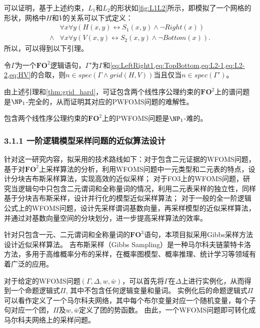 \documentclass[12pt,UTF8,AutoFakeBold=3,a4paper]{ctexart} %
\newcommand{\sentence}{\Gamma}
\newcommand{\weight}{w}
\newcommand{\negweight}{\bar{w}}
\newcommand{\wfoms}{WFOMS}
\newcommand{\fotwo}{\ensuremath{\mathbf{FO}^2}}
\newcommand{\fothree}{\ensuremath{\mathbf{FO}^3}}
\newcommand{\domain}{\Delta}
\begin{document}
可以证明，基于上述约束，$L_1$和$L_2$的形状如\cref{fig:L1L2}所示，即模拟了一个网格的形状，网格中$H$和$V$的关系可以下式定义：
\begin{equation}
  \begin{aligned}
    & \forall x \forall y (H(x,y) \leftrightarrow S_1(x,y) \land \lnot Right(x)) \\
    \land & \forall x \forall y (V(x,y) \leftrightarrow S_2(x,y) \land \lnot Bottom(x)).
  \end{aligned}
  \label{eq:HV}
\end{equation}
所以，可以得到以下引理。

\begin{lemma}\label{lemma:grid_2lo}
  令$\sentence$为一个\fotwo{}逻辑语句，$\sentence'$为$\sentence$和\cref{eq:LeftRight1,eq:TopBottom,eq:L2-1,eq:L2-2,eq:HV}的合取，则$n\in spec(\sentence\land grid(H,V))$当且仅当$n\in spec(\sentence')$。
\end{lemma}

由上述引理和\cref{thm:grid_hard}，可证包含两个线性序公理约束的\fotwo{}上的谱问题是$\NP_1$-完全的，从而证明其对应的PWFOMS问题的难解性。
\begin{theorem}
  包含两个线性序公理约束的\fotwo{}上的PWFOMS问题是$\NP_1$-难的。
\end{theorem}

\subsubsection{3.1.1 一阶逻辑模型采样问题的近似算法设计}

针对这一研究内容，拟采用的技术路线如下：对于包含二元证据的\wfoms{}问题，基于对$\mathbf{FO}^2$上采样算法的分析，利用\wfoms{}问题中一元类型和二元表的特点，设计分块吉布斯采样算法，实现高效的近似采样；
对于FO3上的WFOMS问题，研究当逻辑句中只包含二元谓词和全称量词的情况，利用二元表采样的独立性，同样基于分块吉布斯采样，设计并行化的模型近似采样算法；
对于一般的全一阶逻辑公式上的\wfoms{}问题，设计先采样谓词基数向量，再采样模型的近似采样算法，并通过对基数向量空间的分块划分，进一步提高采样算法的效率。

\subsubsubsection{（1）\fothree{}上的并行近似采样算法}

针对只包含一元、二元谓词和全称量词的\fothree{}语句，本项目拟采用Gibbs采样方法设计近似采样算法。
吉布斯采样（Gibbs Sampling）是一种马尔科夫链蒙特卡洛方法，多用于高维概率分布的采样，在概率图模型、概率推理、统计学习等领域有着广泛的应用。

对于给定的WFOMS问题$(\sentence, \domain,\weight, \negweight)$，可以首先将$\sentence$在$\domain$上进行实例化，从而得到一个命题逻辑式$\Pi$, 其中不包含任何逻辑变量和量词。
实例化后的命题逻辑式$\Pi$可以看作定义了一个马尔科夫网络，其中每个布尔变量对应一个随机变量，每个子句对应一个团，$\Pi$及$\weight, \negweight$定义了团的势函数。
由此，一个WFOMS问题即可转化成马尔科夫网络上的采样问题。
\end{document}
